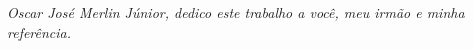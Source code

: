 
\begin{center}
\fontsize{14}{14}
\end{center}

\vspace{10cm}

\begin{flushright}
  \begin{minipage}[10cm] {8.5cm}
  \emph {Oscar Jos\'{e} Merlin J\'{u}nior, dedico este trabalho a voc\^{e}, meu irm\~{a}o e minha refer\^{e}ncia. }
  \end{minipage}
\end{flushright}
